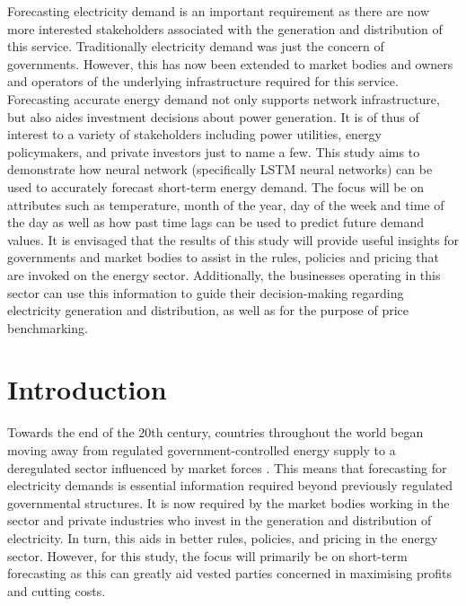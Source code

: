 \documentclass[mstat,12pt]{unswthesis}
\begin{document}
Forecasting electricity demand is an important requirement as there are
now more interested stakeholders associated with the generation and
distribution of this service. Traditionally electricity demand was just
the concern of governments. However, this has now been extended to
market bodies and owners and operators of the underlying infrastructure
required for this service. Forecasting accurate energy demand not only
supports network infrastructure, but also aides investment decisions
about power generation. It is of thus of interest to a variety of
stakeholders including power utilities, energy policymakers, and private
investors just to name a few. This study aims to demonstrate how neural
network (specifically LSTM neural networks) can be used to accurately
forecast short-term energy demand. The focus will be on attributes such
as temperature, month of the year, day of the week and time of the day
as well as how past time lags can be used to predict future demand
values. It is envisaged that the results of this study will provide
useful insights for governments and market bodies to assist in the
rules, policies and pricing that are invoked on the energy sector.
Additionally, the businesses operating in this sector can use this
information to guide their decision-making regarding electricity
generation and distribution, as well as for the purpose of price
benchmarking.



\afterpreface





%
%






\hypertarget{introduction}{%
\chapter{Introduction}\label{introduction}}

Towards the end of the 20th century, countries throughout the world
began moving away from regulated government-controlled energy supply to
a deregulated sector influenced by market forces \cite{Catalao2007}.
This means that forecasting for electricity demands is essential
information required beyond previously regulated governmental
structures. It is now required by the market bodies working in the
sector and private industries who invest in the generation and
distribution of electricity. In turn, this aids in better rules,
policies, and pricing in the energy sector. However, for this study, the
focus will primarily be on short-term forecasting as this can greatly
aid vested parties concerned in maximising profits and cutting costs.
\end{document}
